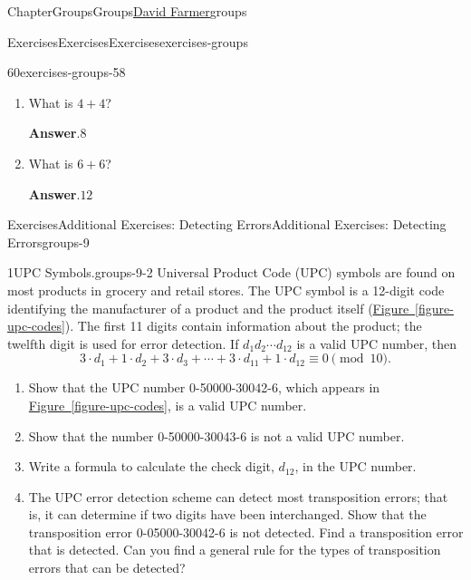 \documentclass[oneside,10pt,]{book}
\newcommand{\blocktitlefont}{\relax}
\newcommand{\xreffont}{\relax}
\numberwithin{equation}{section}
\begin{document}
\begin{chapterptx}{Chapter}{Groups}{}{Groups}{\hyperlink{dfarmer}{David Farmer}}{}{groups}
\begin{exercises-section}{Exercises}{Exercises}{}{Exercises}{}{}{exercises-groups}
\begin{divisionexercise}{60}{}{}{exercises-groups-58}
\begin{enumerate}[font=\bfseries,label=(\alph*),ref=\alph*]
\begin{enumerate}[font=\bfseries,label=(\roman*),ref=\theenumi.\roman*]%
\item{}What is \(4+4\)?%
\par\smallskip%
\noindent\textbf{\blocktitlefont Answer}.\hypertarget{exercises-groups-58-3-2-2}{}\quad{}\(8\)%
\item{}What is \(6+6\)?%
\par\smallskip%
\noindent\textbf{\blocktitlefont Answer}.\hypertarget{exercises-groups-58-3-3-2}{}\quad{}\(12\)%
\end{enumerate}%
\end{enumerate}%
\end{divisionexercise}%
\end{exercises-section}
%
%
\typeout{************************************************}
\typeout{************************************************}
%
\begin{exercises-section}{Exercises}{Additional Exercises: Detecting Errors}{}{Additional Exercises: Detecting Errors}{}{}{groups-9}
\begin{divisionexercise}{1}{UPC Symbols.}{}{groups-9-2}%
Universal Product Code (UPC) symbols are found on most products in grocery and retail stores. The UPC symbol is a 12-digit code identifying the manufacturer of a product and the product itself (\hyperref[figure-upc-codes]{Figure~{\xreffont\ref{figure-upc-codes}}}). The first 11 digits contain information about the product; the twelfth digit is used for error detection. If \(d_1 d_2 \cdots d_{12}\) is a valid UPC number, then%
\begin{equation*}
3 \cdot d_1 + 1 \cdot d_2 + 3 \cdot d_3 + \cdots + 3 \cdot d_{11} + 1 \cdot d_{12} \equiv 0 \pmod{10}\text{.}
\end{equation*}
%
%
\begin{enumerate}[label={(\alph*)}]
\item{}Show that the UPC number  0-50000-30042-6, which appears in \hyperref[figure-upc-codes]{Figure~{\xreffont\ref{figure-upc-codes}}}, is a valid UPC number.%
\item{}Show that the number 0-50000-30043-6 is not a valid UPC number.%
\item{}Write a  formula to calculate the check digit, \(d_{12}\), in the UPC number.%
\item{}The  UPC error detection scheme can detect most transposition errors; that is, it can determine if two digits have been interchanged.  Show that the transposition error 0-05000-30042-6 is not detected.  Find a transposition error that is detected.  Can you find a general rule for the types of transposition errors that can be detected?%

\end{enumerate}
\end{divisionexercise}
\end{exercises-section}
\end{chapterptx}
\end{document}
